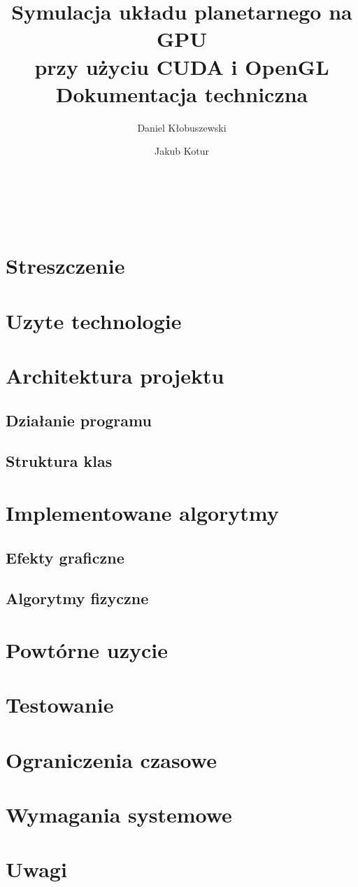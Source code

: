 \documentclass[a4paper,titlepage,10pt]{article}
\title{\huge Symulacja układu planetarnego na GPU\\ przy użyciu CUDA i OpenGL\\\small Dokumentacja techniczna}
\author{Daniel Kłobuszewski\and Jakub Kotur}
\begin{document}
	\maketitle
	
	\pagestyle{fancyplain}
	\cfoot{\thepage/\pageref{LastPage}}

	\hfill \\
	
	\hfill \\
	

	\newpage

	\tableofcontents
	\newpage

	\section{Streszczenie}\label{sec:streszczenie}
	
	\section{Uzyte technologie}\label{sec:uzyte technologie}
	
	\section{Architektura projektu}\label{sec:architektura projektu}
	\subsection{Działanie programu}\label{sub:dzialanie programu}
	
	\subsection{Struktura klas}\label{sub:struktura klas}
	
	\section{Implementowane algorytmy}\label{sec:implementowane algorytmy}
	\subsection{Efekty graficzne}\label{sub:algorytmy graficzne}
	
	\subsection{Algorytmy fizyczne}\label{sub:algorytmy fizyczne}
	
	\section{Powtórne uzycie}\label{sec:powtorne uzycie}
	
	\section{Testowanie}\label{sec:testy}
	
	\section{Ograniczenia czasowe}\label{sec:ograniczenia czasowe}
	
	\section{Wymagania systemowe}\label{sec:wymagania systemowe}
	
	\section{Uwagi}\label{sec:uwagi}
	
\end{document}

